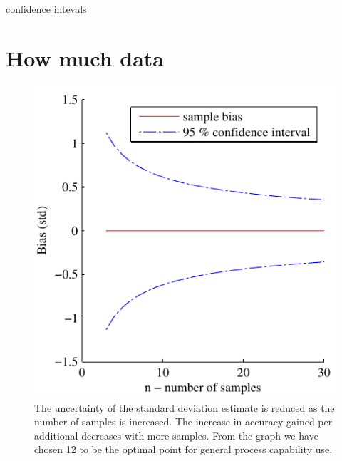 \documentclass[aip,amsmath, reprint, author-year]{revtex4-1}
\begin{document}
confidence intevals

\section{How much data}


\begin{figure}
\includegraphics{stats_bias_confidence.pdf}
\caption{\label{fig:std_uncertainty}The uncertainty of the standard deviation estimate is reduced as the number of samples is increased. The increase in accuracy gained per additional decreases with more samples. From the graph we have chosen 12 to be the optimal point for general process capability use.}
\end{figure}
\end{document}
